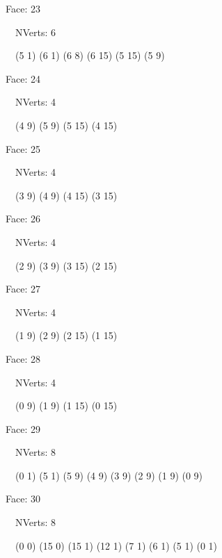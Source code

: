 \documentclass{article}
\begin{document}
{\footnotesize 

Face: 23

\   \    NVerts: 6

 \   \   (5 1) (6 1) (6 8) (6 15) (5 15) (5 9)}

{\footnotesize 

Face: 24

\   \    NVerts: 4

 \   \   (4 9) (5 9) (5 15) (4 15)}

{\footnotesize 

Face: 25

\   \    NVerts: 4

 \   \   (3 9) (4 9) (4 15) (3 15)}

{\footnotesize 

Face: 26

\   \    NVerts: 4

 \   \   (2 9) (3 9) (3 15) (2 15)}

{\footnotesize 

Face: 27

\   \    NVerts: 4

 \   \   (1 9) (2 9) (2 15) (1 15)}

{\footnotesize 

Face: 28

\   \    NVerts: 4

 \   \   (0 9) (1 9) (1 15) (0 15)}

{\footnotesize 

Face: 29

\   \    NVerts: 8

 \   \   (0 1) (5 1) (5 9) (4 9) (3 9) (2 9) (1 9) (0 9)}

{\footnotesize 

Face: 30

\   \    NVerts: 8

 \   \   (0 0) (15 0) (15 1) (12 1) (7 1) (6 1) (5 1) (0 1)}


 \newpage
\end{document}
